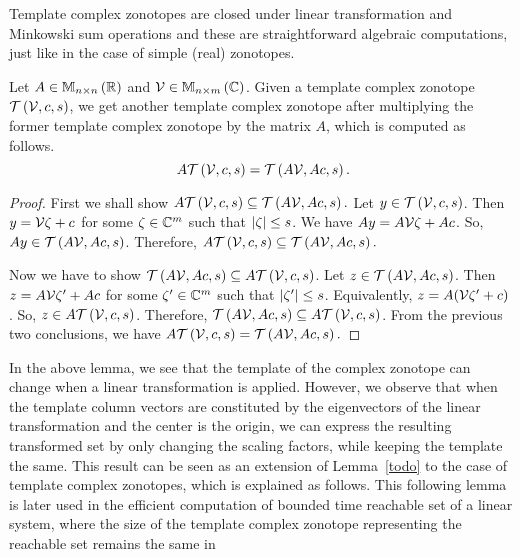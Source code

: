 Template complex zonotopes are closed under linear transformation and
Minkowski sum operations and these are straightforward algebraic
computations, just like in the case of simple (real) zonotopes.
%
\begin{lemma}
Let $A\in\mathbb{M}_{n\times n}\left(\mathbb{R}\right)$ and $\mathcal{V}\in\mathbb{M}_{n\times m}\left(\mathbb{C}\right)$.
Given a template complex zonotope $\mathit{\mathcal{T}}\left(\mathcal{V},c,s\right)$, we
get another template complex zonotope after multiplying the former
template complex zonotope by the matrix $A$, which is computed as
follows. 
%
\begin{equation}~\label{eqn:lin-transform}
A\mathit{\mathcal{T}}\left(\mathcal{V},c,s\right)=\mathit{\mathcal{T}}\left(A\mathcal{V},Ac,s\right).
\end{equation}
%
\end{lemma}
%
\begin{proof}
First we shall show
$A\mathit{\mathcal{T}}\left(\mathcal{V},c,s\right)\subseteq\mathit{\mathcal{T}}\left(A\mathcal{V},Ac,s\right).$
Let $y\in\mathit{\mathcal{T}}\left(\mathcal{V},c,s\right)$.  Then $y=\mathcal{V}\zeta+c$
for some $\zeta\in\mathbb{C}^m$ such that
$\left|\zeta\right|\leq s$.  We have $Ay=A\mathcal{V}\zeta+Ac$.  So,
$Ay\in\mathit{\mathcal{T}}\left(A\mathcal{V},Ac,s\right)$.  Therefore,
$A\mathit{\mathcal{T}}\left(\mathcal{V},c,s\right)\subseteq\mathit{\mathcal{T}}\left(A\mathcal{V},Ac,s\right).$
 
Now we have to show $\mathit{\mathcal{T}}\left(A\mathcal{V},Ac,s\right)\subseteq
A\mathit{\mathcal{T}}\left(\mathcal{V},c,s\right)$.  Let
$z\in\mathit{\mathcal{T}}\left(A\mathcal{V},Ac,s\right)$.  Then $z=A\mathcal{V}\zeta^\prime+Ac$
for some $\zeta^\prime\in\mathbb{C}^m$ such that
$\left|\zeta^\prime\right|\leq s$.  Equivalently, $z=
A(\mathcal{V}\zeta^\prime+c)$.  So, $z\in
A\mathit{\mathcal{T}}\left(\mathcal{V},c,s\right)$.  Therefore, $\mathit{\mathcal{T}}\left(A\mathcal{V},Ac,s\right)\subseteq
A\mathit{\mathcal{T}}\left(\mathcal{V},c,s\right)$.
From the previous two conclusions, we have
$A\mathit{\mathcal{T}}\left(\mathcal{V},c,s\right)=\mathit{\mathcal{T}}\left(A\mathcal{V},Ac,s\right).$
\end{proof}
%
In the above lemma, we see that the template of the complex zonotope
can change when a linear transformation is applied.  However, we
observe that when the template column vectors are constituted by the
eigenvectors of the linear transformation and the center is the
origin, we can express the resulting transformed set by only changing
the scaling factors, while keeping the template the same.  This result
can be seen as an extension of Lemma~\ref{todo} to the case of
template complex zonotopes, which is explained as follows.  This
following lemma is later used in the efficient computation of bounded
time reachable set of a linear system, where the size of the template
complex zonotope representing the reachable set remains the same in
